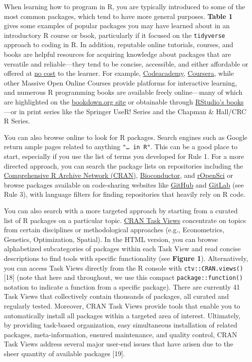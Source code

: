 \documentclass[10pt,letterpaper]{article}
\begin{document}
When learning how to program in R, you are typically introduced to some
of the most common packages, which tend to have more general purposes.
\textbf{Table 1} gives some examples of popular packages you may have
learned about in an introductory R course or book, particularly if it
focused on the \texttt{tidyverse} approach to coding in R. In addition,
reputable online tutorials, courses, and books are helpful resources for
acquiring knowledge about packages that are versatile and
reliable---they tend to be concise, accessible, and either affordable or
offered at \href{https://committedtotape.shinyapps.io/freeR/}{no cost}
to the learner. For example,
\href{https://www.codecademy.com/learn/learn-r}{Codeacademy},
\href{https://www.coursera.org/learn/r-programming}{Coursera}, while
other Massive Open Online Courses provide platforms for interactive
learning, and numerous R programming books are available freely
online---many of which are highlighted on the
\href{https://bookdown.org/}{bookdown.org site} or obtainable through
\href{https://rstudio.com/resources/books/}{RStudio's books}---or in
print series like the Springer UseR! Series and the Chapman \& Hall/CRC
R Series.

You can also browse online to look for R packages. Search engines such
as Google return ample pages related to anything
\texttt{"\ldots{}\ in\ R"}. This can be a good place to start,
especially if you use the list of terms you developed for Rule 1. For a
more directed approach, you can search the package lists on repositories
including the \href{https://cran.r-project.org/}{Comprehensive R Archive
Network (CRAN)}, \href{https://www.bioconductor.org/}{Bioconductor}, and
\href{https://ropensci.org/}{rOpenSci} or browse packages available on
code-sharing websites like \href{https://github.com/}{GitHub} and
\href{https://about.gitlab.com/}{GitLab} (see Rule 3), with language
filters for finding repositories that heavily rely on R code.

You can also search with a more targeted approach by starting from a
curated list of R packages on a particular topic.
\href{https://cran.r-project.org/web/views/}{CRAN Task Views}
concentrate on topics from certain disciplines or methodological
approaches (e.g., Econometrics, Genetics, Optimization, Spatial). In the
HTML version, you can browse alphabetized subcategories of packages
within each Task View and read concise descriptions to find tools with
specific functionality (see \textbf{Figure 1}). Alternatively, you can
access Task Views directly from the R console with
\texttt{ctv::CRAN.views()} {[}18{]} (note that here and throughout, we
use this compact \texttt{package::function()} notation to indicate a
function from a specific package). There are currently 41 Task Views
that collectively contain thousands of packages, all curated and
regularly tested. Moreover, CRAN Task Views provide tools that enable
you to automatically install all packages within a targeted area of
interest. Ultimately, by providing task-based organization, easy
simultaneous installation of related packages, meta-information, ensured
maintenance, and quality control, CRAN Task Views address several major
user-end issues that have arisen due to the sheer quantity of available
packages {[}19{]}.
\end{document}
